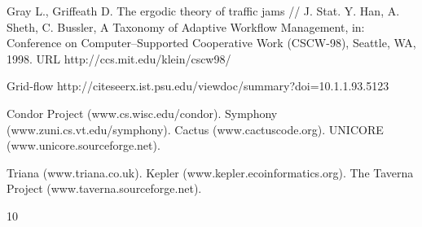 \documentclass[koi8-r,usehyperref,12pt]{G7-32}
\begin{document}
\begin{thebibliography}{10}
 Gray L., Griffeath D. The ergodic theory of traffic jams // J. Stat. 
 Y. Han, A. Sheth, C. Bussler, A Taxonomy of Adaptive Workflow Management, in:
Conference on Computer–Supported Cooperative Work (CSCW-98), Seattle, WA,
1998.
URL http://ccs.mit.edu/klein/cscw98/


Grid-flow http://citeseerx.ist.psu.edu/viewdoc/summary?doi=10.1.1.93.5123

 Condor Project (www.cs.wisc.edu/condor).
 Symphony (www.zuni.cs.vt.edu/symphony).
 Cactus (www.cactuscode.org).
 UNICORE (www.unicore.sourceforge.net).


 Triana (www.triana.co.uk).
 Kepler (www.kepler.ecoinformatics.org).
 The Taverna Project (www.taverna.sourceforge.net).



\end{thebibliography}{10}
\end{document}

